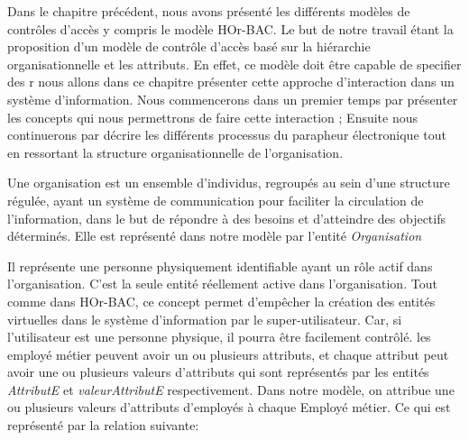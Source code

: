 \label{chapAHOr-BAC}


\label{sectionIntroduction}

Dans le chapitre précédent, nous avons présenté les différents modèles de contrôles d'accès y compris le modèle HOr-BAC. Le but de notre travail étant la proposition d'un modèle de contrôle d'accès basé sur la hiérarchie organisationnelle et les attributs. En effet, ce modèle doit être capable de specifier des r  nous allons dans ce chapitre présenter cette approche d'interaction dans un système d'information. Nous commencerons dans un premier temps par présenter les concepts qui nous permettrons de faire cette interaction ; Ensuite nous continuerons par décrire les différents processus du parapheur électronique tout en ressortant la structure organisationnelle
de l'organisation.

\label{sectionConcept}

\label{sectionOrganisation} 
Une organisation est un ensemble d'individus, regroupés au sein d'une structure régulée, ayant un système de communication pour faciliter la circulation de l'information, dans le but de répondre à des besoins et d'atteindre des objectifs déterminés. Elle est représenté dans notre modèle par l'entité \textit{Organisation}

\label{sectionEmployeMetier} 
Il représente une personne physiquement identifiable ayant un rôle actif dans l'organisation. C'est la seule entité réellement active dans l'organisation. Tout comme dans HOr-BAC, ce concept permet d'empêcher la création des entités virtuelles dans le système d'information par le super-utilisateur. Car, si l'utilisateur est une personne physique, il pourra être facilement contrôlé. les employé métier peuvent avoir un ou plusieurs attributs, et chaque attribut peut avoir une ou plusieurs valeurs d'attributs qui sont représentés par les entités \textit{AttributE} et \textit{valeurAttributE} respectivement. Dans notre modèle, on attribue une ou plusieurs valeurs d'attributs d'employés à chaque Employé métier. Ce qui est représenté par la relation suivante: %


